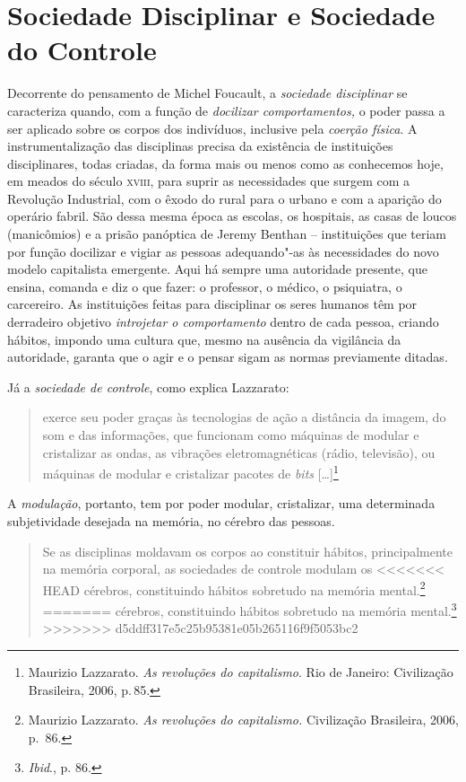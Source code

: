 \section{Sociedade Disciplinar e Sociedade do Controle}

Decorrente do pensamento de Michel Foucault, a \emph{sociedade
disciplinar} se caracteriza quando, com a função de \emph{docilizar
comportamentos,} o poder passa a ser aplicado sobre os corpos dos
indivíduos, inclusive pela \emph{coerção física}. A instrumentalização
das disciplinas precisa da existência de instituições disciplinares,
todas criadas, da forma mais ou menos como as conhecemos hoje, em meados
do século \textsc{xviii}, para suprir as necessidades que surgem com a Revolução
Industrial, com o êxodo do rural para o urbano e com a aparição do
operário fabril. São dessa mesma época as escolas, os hospitais, as
casas de loucos (manicômios) e a prisão panóptica de Jeremy Benthan --
instituições que teriam por função docilizar e vigiar as pessoas
adequando"-as às necessidades do novo modelo capitalista emergente. Aqui
há sempre uma autoridade presente, que ensina, comanda e diz o que
fazer: o professor, o médico, o psiquiatra, o carcereiro. As
instituições feitas para disciplinar os seres humanos têm por derradeiro
objetivo \emph{introjetar o comportamento} dentro de cada pessoa,
criando hábitos, impondo uma cultura que, mesmo na ausência da
vigilância da autoridade, garanta que o agir e o pensar sigam as normas
previamente ditadas.

Já a \emph{sociedade de controle}, como explica Lazzarato:

\begin{quote}
exerce seu poder graças às tecnologias de ação a distância da imagem, do
som e das informações, que funcionam como máquinas de modular e
cristalizar as ondas, as vibrações eletromagnéticas (rádio, televisão),
ou máquinas de modular e cristalizar pacotes de \emph{bits} {[}\ldots{}{]}\footnote{Maurizio Lazzarato. \emph{As revoluções do capitalismo}. Rio de Janeiro: Civilização
Brasileira, 2006, p.\,85.}
\end{quote}

A \emph{modulação}, portanto, tem por poder modular, cristalizar, uma
determinada subjetividade desejada na memória, no cérebro das pessoas.

\begin{quote}
Se as disciplinas moldavam os corpos ao constituir hábitos,
principalmente na memória corporal, as sociedades de controle modulam os
<<<<<<< HEAD
cérebros, constituindo hábitos sobretudo na memória mental.\footnote{Maurizio Lazzarato. \emph{As revoluções do capitalismo.} Civilização Brasileira, 2006, p.\, 86.}
=======
cérebros, constituindo hábitos sobretudo na memória mental.\footnote{\textit{Ibid}., p. 86.}
>>>>>>> d5ddff317e5c25b95381e05b265116f9f5053bc2
\end{quote}

